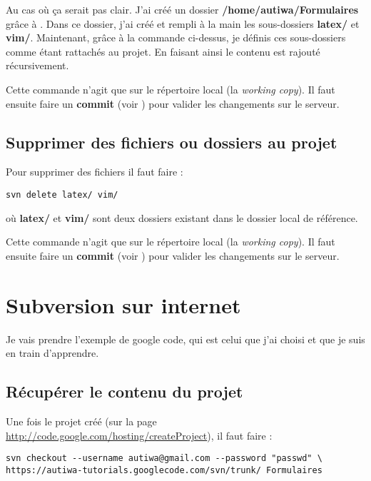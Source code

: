 \documentclass[a4paper,twoside]{article}
\begin{document}
\begin{remarque}
Au cas où ça serait pas clair. J'ai créé un dossier \textbf{/home/autiwa/Formulaires} grâce à . Dans ce dossier, j'ai créé et rempli à la main les sous-dossiers \textbf{latex/} et \textbf{vim/}. Maintenant, grâce à la commande ci-dessus, je définis ces sous-dossiers comme étant rattachés au projet. En faisant ainsi le contenu est rajouté récursivement.
\end{remarque}

\begin{attention}
Cette commande n'agit que sur le répertoire local (la \emph{working copy}). Il faut ensuite faire un \textbf{commit} (voir ) pour valider les changements sur le serveur.
\end{attention}

\subsection{Supprimer des fichiers ou dossiers au projet}
Pour supprimer des fichiers il faut faire :
\begin{verbatim}
svn delete latex/ vim/ 
\end{verbatim}
où \textbf{latex/} et \textbf{vim/} sont deux dossiers existant dans le dossier local de référence. 

\begin{attention}
Cette commande n'agit que sur le répertoire local (la \emph{working copy}). Il faut ensuite faire un \textbf{commit} (voir ) pour valider les changements sur le serveur.
\end{attention}

\section{Subversion sur internet}
Je vais prendre l'exemple de google code, qui est celui que j'ai choisi et que je suis en train d'apprendre.

\subsection{Récupérer le contenu du projet}\label{sec:checkout}
Une fois le projet créé (sur la page \url{http://code.google.com/hosting/createProject}), il faut faire : 
\begin{verbatim}
svn checkout --username autiwa@gmail.com --password "passwd" \
https://autiwa-tutorials.googlecode.com/svn/trunk/ Formulaires
\end{verbatim}
\end{document}
